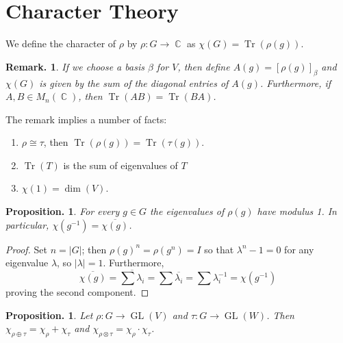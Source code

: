 \documentclass[11pt, a4paper]{memoir}
\DeclareMathOperator{\C}{{\mathbb{C}}}
\theoremstyle{change}
\newtheorem{proposition}[theorem]{Proposition.}
\theoremstyle{plain}
\theoremstyle{nonumberplain}
\newtheorem{remark}{Remark.}
\newtheorem{proof}{Proof}
\DeclareMathOperator{\GL}{GL}
\DeclareMathOperator{\Tr}{Tr}
\numberwithin{equation}{section}
\begin{document}
\section{Character Theory}
We define the character of $\rho$ by $\rho:G\to\C$ as $\chi(G)=\Tr(\rho(g))$.
\begin{remark}
    If we choose a basis $\beta$ for $V$, then define $A(g)=[\rho(g)]_\beta$ and $\chi(G)$ is given by the sum of the diagonal entries of $A(g)$.
    Furthermore, if $A,B\in M_n(\C)$, then $\Tr(AB)=\Tr(BA)$.
\end{remark}
The remark implies a number of facts:
\begin{enumerate}[nl,r]
    \item $\rho\cong\tau$, then $\Tr(\rho(g))=\Tr(\tau(g))$.
    \item $\Tr(T)$ is the sum of eigenvalues of $T$
    \item $\chi(1)=\dim(V)$.
\end{enumerate}
\begin{proposition}
    For every $g\in G$ the eigenvalues of $\rho(g)$ have modulus 1.
    In particular, $\chi(g^{-1})=\overline{\chi(g)}$.
\end{proposition}
\begin{proof}
    Set $n=|G|$; then $\rho(g)^n=\rho(g^n)=I$ so that $\lambda^n-1=0$ for any eigenvalue $\lambda$, so $|\lambda|=1$.
    Furthermore,
    \begin{equation*}
        \overline{\chi(g)}=\overline{\sum\lambda_i}=\sum\overline{\lambda_i}=\sum\lambda_i^{-1}=\chi(g^{-1})
    \end{equation*}
    proving the second component.
\end{proof}
\begin{proposition}
    Let $\rho:G\to\GL(V)$ and $\tau:G\to\GL(W)$.
    Then $\chi_{\rho\oplus\tau}=\chi_\rho+\chi_\tau$ and $\chi_{\rho\otimes\tau}=\chi_\rho\cdot\chi_\tau$.
\end{proposition}
\end{document}
